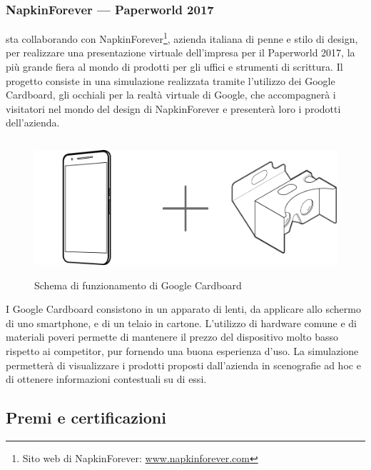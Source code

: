    \subsubsection{NapkinForever --- Paperworld 2017}
   \nomeAzienda{} sta collaborando con NapkinForever\footnote{Sito web di NapkinForever: \href{www.napkinforever.com}{www.napkinforever.com}}, azienda italiana di penne e stilo di design, per realizzare una presentazione virtuale dell'impresa per il Paperworld 2017, la più grande fiera al mondo di prodotti per gli uffici e strumenti di scrittura. Il progetto consiste in una simulazione realizzata tramite l'utilizzo dei Google Cardboard, gli occhiali per la realtà virtuale di Google, che accompagnerà i visitatori nel mondo del design di NapkinForever e presenterà loro i prodotti dell'azienda.
   \begin{figure}[H]
      \begin{center}
         \includegraphics[width=15cm,height=5cm,keepaspectratio]{immagini/cardboard-schema}
      \end{center}
      \caption{Schema di funzionamento di Google Cardboard}\label{schemacardboard}
   \end{figure}
   I Google Cardboard consistono in un apparato di lenti, da applicare allo schermo di uno smartphone, e di un telaio in cartone. L'utilizzo di hardware comune e di materiali poveri permette di mantenere il prezzo del dispositivo molto basso rispetto ai competitor, pur fornendo una buona esperienza d'uso. La simulazione permetterà di visualizzare i prodotti proposti dall'azienda in scenografie ad hoc e di ottenere informazioni contestuali su di essi.

   \subsection{Premi e certificazioni}


